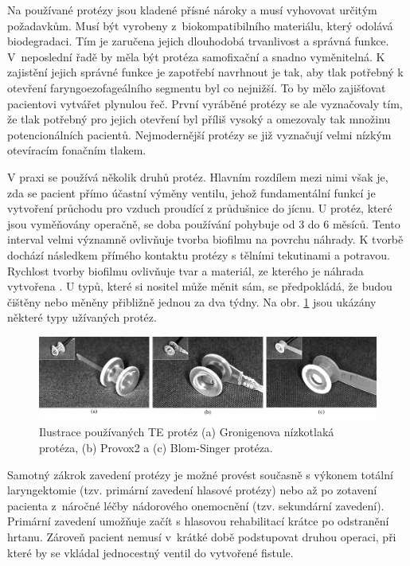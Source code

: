Na používané protézy jsou kladené
přísné nároky a musí vyhovovat určitým požadavkům. Musí být vyrobeny
z~biokompatibilního materiálu, který odolává biodegradaci. Tím je zaručena jejich
dlouhodobá trvanlivost a správná funkce. V~neposlední řadě by měla být protéza
samofixační a snadno vyměnitelná.
 K zajistění jejich správné funkce je zapotřebí navrhnout je tak, aby
tlak potřebný k otevření faryngoezofageálního segmentu byl co nejnižší. To by mělo zajišťovat pacientovi vytvářet
plynulou řeč. První vyráběné protézy se ale vyznačovaly tím, že tlak potřebný pro jejich otevření byl příliš vysoký a omezovaly tak množinu potencionálních pacientů. Nejmodernější protézy se již vyznačují
velmi nízkým otevíracím fonačním tlakem.

V praxi se používá několik druhů protéz. Hlavním rozdílem mezi nimi však je,
zda se pacient přímo účastní výměny ventilu, jehož fundamentální funkcí je
vytvoření průchodu pro vzduch proudící z průdušnice do jícnu. U protéz, které
jsou vyměňovány operačně, se doba používání pohybuje od 3 do 6 měsíců. Tento
interval velmi významně ovlivňuje tvorba biofilmu na povrchu náhrady. K tvorbě
dochází následkem přímého kontaktu protézy s tělními tekutinami a potravou.
Rychlost tvorby biofilmu ovlivňuje tvar a materiál, ze kterého je náhrada
vytvořena \cite{Leunisse2001}. U typů, které si nositel může měnit sám, se
předpokládá, že budou čištěny nebo měněny přibližně jednou za dva týdny. Na obr. \ref{fig:cause:treatment:prosthesis} jsou
ukázány některé typy užívaných protéz.

\begin{figure}[htb]
  \begin{center}
    \includegraphics[width=0.9\linewidth]{ch3-cause/figures/te-protezy}
    \caption[Ilustrace používaných TE protéz.]{Ilustrace používaných TE protéz (a) Gronigenova nízkotlaká protéza, (b) Provox2 a (c) Blom-Singer protéza.}
    \label{fig:cause:treatment:prosthesis}
  \end{center}
\end{figure}


Samotný zákrok zavedení protézy je možné provést současně s výkonem totální
laryngektomie (tzv. primární zavedení hlasové protézy) nebo až po zotavení
pacienta z~náročné léčby nádorového onemocnění (tzv. sekundární zavedení).
Primární zavedení umožňuje začít s hlasovou rehabilitací krátce po odstranění
hrtanu. Zároveň pacient nemusí v~krátké době podstupovat druhou operaci, při
které by se vkládal jednocestný ventil do vytvořené fistule.



